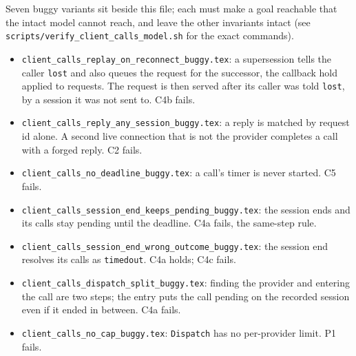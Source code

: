 \documentclass[a4paper,10pt,fleqn]{article}
\begin{document}
Seven buggy variants sit beside this file; each must make a goal reachable
that the intact model cannot reach, and leave the other invariants intact
(see \texttt{scripts/verify\_client\_calls\_model.sh} for the exact commands).
\begin{itemize}
  \item \texttt{client\_calls\_replay\_on\_reconnect\_buggy.tex}: a
    supersession tells the caller \texttt{lost} and also queues the request
    for the successor, the callback hold applied to requests.  The request
    is then served after its caller was told \texttt{lost}, by a session it
    was not sent to.  C4b fails.
  \item \texttt{client\_calls\_reply\_any\_session\_buggy.tex}: a reply is
    matched by request id alone.  A second live connection that is not the
    provider completes a call with a forged reply.  C2 fails.
  \item \texttt{client\_calls\_no\_deadline\_buggy.tex}: a call's timer is
    never started.  C5 fails.
  \item \texttt{client\_calls\_session\_end\_keeps\_pending\_buggy.tex}: the
    session ends and its calls stay pending until the deadline.  C4a fails,
    the same-step rule.
  \item \texttt{client\_calls\_session\_end\_wrong\_outcome\_buggy.tex}: the
    session end resolves its calls as \texttt{timedout}.  C4a holds; C4c
    fails.
  \item \texttt{client\_calls\_dispatch\_split\_buggy.tex}: finding the
    provider and entering the call are two steps; the entry puts the call
    pending on the recorded session even if it ended in between.  C4a fails.
  \item \texttt{client\_calls\_no\_cap\_buggy.tex}: \texttt{Dispatch} has no
    per-provider limit.  P1 fails.
\end{itemize}
\end{document}
